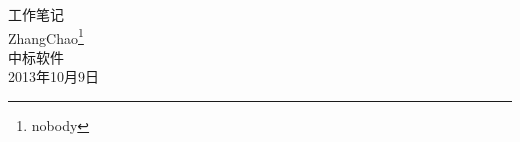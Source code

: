 \begin{titlepage}
\vspace*{10mm}
\begin{center}
{\heiti \Huge 工作笔记}\\[30mm]

{\Large ZhangChao\footnote{nobody}}\\[5mm]
{\Large 中标软件}\\[40mm]
2013年10月9日
\end{center}
\end{titlepage}